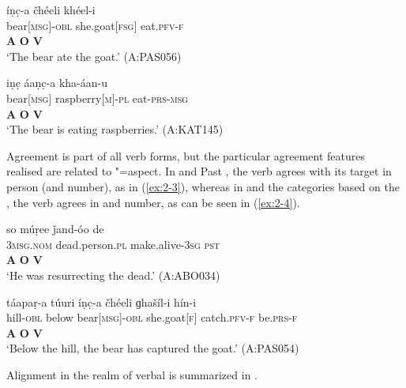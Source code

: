 \begin{exe}
\ex
\label{ex:2-1}
\glll íṇc̣-a čhéeli khéel-i \\
bear[\textsc{msg}]-\textsc{obl} she.goat[\textsc{fsg}] eat.\textsc{pfv-}\textsc{f}\\
\textbf{A} \textbf{O} \textbf{V}\\
\glt `The bear ate the goat.' (A:PAS056)
\end{exe}


\begin{exe}
\ex
\label{ex:2-2}
\glll iṇc̣ áaṇc̣-a kha-áan-u\\
bear[\textsc{msg}] raspberry[\textsc{m}]-\textsc{pl} eat-\textsc{prs-msg} \\
\textbf{A} \textbf{O} \textbf{V}\\
\glt `The bear is eating raspberries.' (A:KAT145)
\end{exe} 


Agreement is part of all  verb forms, but the particular agreement features realised are related to "=aspect. In  and Past , the verb agrees with its target in person (and number), as in (\ref{ex:2-3}), whereas in  and the categories based on the , the verb agrees in  and number, as can be seen in (\ref{ex:2-4}).

\begin{exe}
\ex
\label{ex:2-3}
\glll so múṛee ǰand-óo de \\
\textsc{3msg.nom} dead.person.\textsc{pl} make.alive-\textsc{3sg} \textsc{pst} \\
\textbf{A} \textbf{O} \textbf{V} \\
\glt `He was resurrecting the dead.' (A:ABO034)
\end{exe}

\begin{exe}
\ex
\label{ex:2-4}
\glll táapaṛ-a túuri íṇc̣-a čhéeli ɡhašíl-i hín-i \\ 
hill-\textsc{obl} below bear[\textsc{msg}]-\textsc{obl} she.goat[\textsc{f}] catch.\textsc{pfv-f} be.\textsc{prs-f} \\
{} {} \textbf{A} \textbf{O} \textbf{V} \\
\glt `Below the hill, the bear has captured the goat.' (A:PAS054)
\end{exe}


Alignment in the realm of verbal  is summarized in . 


